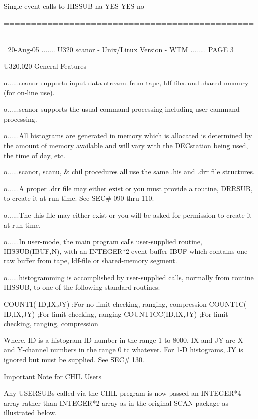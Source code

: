    Single event calls to HISSUB     na       YES       YES        no
 
   ===========================================================================
 
    
   20-Aug-05 ....... U320  scanor - Unix/Linux Version - WTM ........ PAGE   3
 
 
   U320.020  General Features
 
   o......scanor  supports  input  data  streams  from  tape,  ldf-files   and
          shared-memory (for on-line use).
 
   o......scanor  supports the usual command processing including user cammand
          processing.
 
   o......All histograms  are  generated  in  memory  which  is  allocated  is
          determined  by the amount of memory available and will vary with the
          DECstation being used, the time of day, etc.
 
   o......scanor, scanu, & chil procedures all use  the  same  .his  and  .drr
          file structures.
 
   o......A  proper  .drr file may either exist or you must provide a routine,
          DRRSUB, to create it at run time. See SEC# 090 thru 110.
 
   o......The .his file may either exist or you will be asked  for  permission
          to create it at run time.
 
   o......In  user-mode,  the  main  program  calls   user-supplied   routine,
          HISSUB(IBUF,N),  with  an INTEGER*2 event buffer IBUF which contains
          one raw buffer from tape, ldf-file or shared-memory segment.
 
   o......histogramming is accomplished by user-supplied calls, normally  from
          routine HISSUB, to one of the following standard routines:
 
          COUNT1(  ID,IX,JY)   ;For no limit-checking, ranging, compression
          COUNT1C( ID,IX,JY)   ;For    limit-checking, ranging
          COUNT1CC(ID,IX,JY)   ;For    limit-checking, ranging, compression
 
          Where,  ID  is  a histogram ID-number in the range 1 to 8000. IX and
          JY are X- and Y-channel numbers in the range 0 to whatever. For  1-D
          histograms, JY is ignored but must be supplied. See SEC# 130.
 
   Important Note for CHIL Users
 
   Any  USERSUBs  called via the CHIL program is now passed an INTEGER*4 array
   rather than INTEGER*2 array as in the original SCAN package as  illustrated
   below.
 
